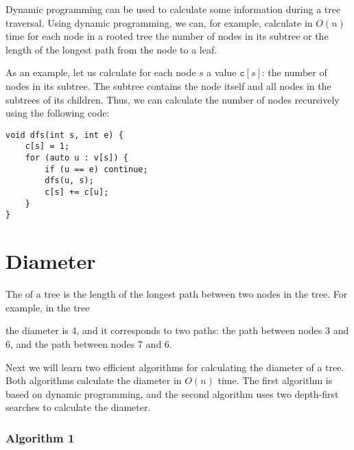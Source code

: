 Dynamic programming can be used to calculate
some information during a tree traversal.
Using dynamic programming, we can, for example,
calculate in $O(n)$ time for each node
in a rooted tree the
number of nodes in its subtree
or the length of the longest path from the node
to a leaf.

As an example, let us calculate for each node $s$
a value $\texttt{c}[s]$: the number of nodes in its subtree.
The subtree contains the node itself and
all nodes in the subtrees of its children.
Thus, we can calculate the number of nodes
recursively using the following code:

\begin{lstlisting}
void dfs(int s, int e) {
    c[s] = 1;
    for (auto u : v[s]) {
        if (u == e) continue;
        dfs(u, s);
        c[s] += c[u];
    }
}
\end{lstlisting}

\section{Diameter}


The  of a tree
is the length of the longest path
between two nodes in the tree.
For example, in the tree
\begin{center}
\end{center}
the diameter is 4, and it corresponds to two paths:
the path between nodes 3 and 6,
and the path between nodes 7 and 6.

Next we will learn two efficient algorithms
for calculating the diameter of a tree.
Both algorithms calculate the diameter in $O(n)$ time.
The first algorithm is based on dynamic programming,
and the second algorithm uses two depth-first searches
to calculate the diameter.

\subsubsection{Algorithm 1}


